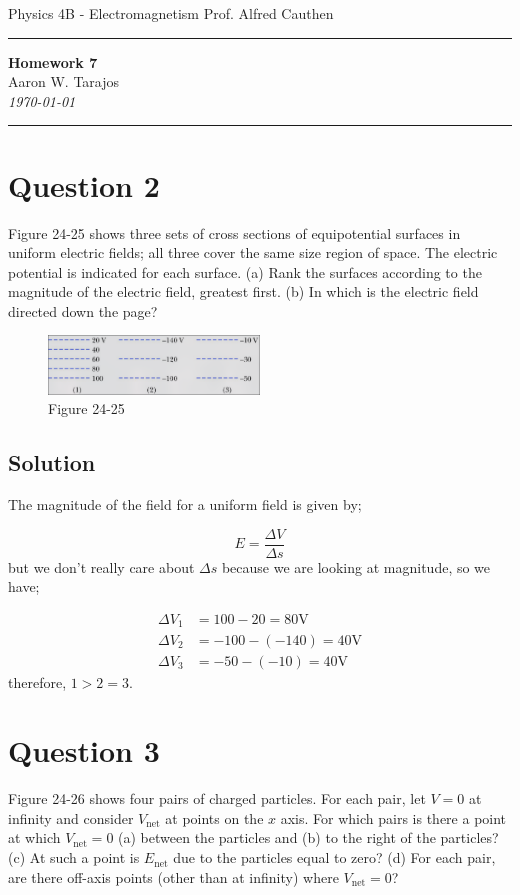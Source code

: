 \documentclass{article}
\newcommand{\V}{\text{V}}
\begin{document}
\noindent
Physics 4B - Electromagnetism \hfill Prof. Alfred Cauthen
\noindent\rule{\textwidth}{0.4pt}

\begin{center}
    \textbf{\LARGE Homework 7} \\
    \vspace{12pt}
    \large Aaron W. Tarajos \\
    \textit{\today}
\end{center}

\noindent\rule{\textwidth}{0.4pt}

\section*{Question 2}
Figure 24-25 shows three sets of cross sections of equipotential surfaces in uniform electric fields; all three cover the same size region of space. The electric potential is indicated for each surface. (a) Rank the surfaces according to the magnitude of the electric field, greatest first. (b) In which is the electric field directed down the page?

\begin{figure}[h]
	\centering
	\includegraphics[width=0.5\textwidth]{image.png}
	\caption{Figure 24-25}
\end{figure}

\subsection*{Solution}
The magnitude of the field for a uniform field is given by;

\begin{equation}
	E = \frac{\Delta V}{\Delta s}
\end{equation}
but we don't really care about $\Delta s$ because we are looking at magnitude, so we have;

\begin{align*}
	\Delta V_1 &= 100 - 20 = 80 \V \\
	\Delta V_2 &= -100 - (-140) = 40 \V \\
	\Delta V_3 &= -50 - (-10) = 40 \V
\end{align*}
therefore, $1 > 2 = 3$.

\section*{Question 3}
Figure 24-26 shows four pairs of charged particles. For each pair, let
$V = 0$ at infinity and consider $V_\text{net}$ at points on the $x$ axis. For which pairs
is there a point at which $V_\text{net} = 0$ (a) between the particles and (b) to the right of the particles? (c) At such a point is $E_\text{net}$ due to the particles equal to zero? (d) For each pair, are there off-axis points (other than at infinity) where $V_\text{net} = 0$?
\end{document}
